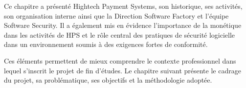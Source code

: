 Ce chapitre a présenté Hightech Payment Systems, son historique, ses activités, son organisation interne ainsi que la Direction Software Factory et l'équipe Software Security. Il a également mis en évidence l'importance de la monétique dans les activités de HPS et le rôle central des pratiques de sécurité logicielle dans un environnement soumis à des exigences fortes de conformité.

Ces éléments permettent de mieux comprendre le contexte professionnel dans lequel s'inscrit le projet de fin d'études. Le chapitre suivant présente le cadrage du projet, sa problématique, ses objectifs et la méthodologie adoptée.

\clearpage
